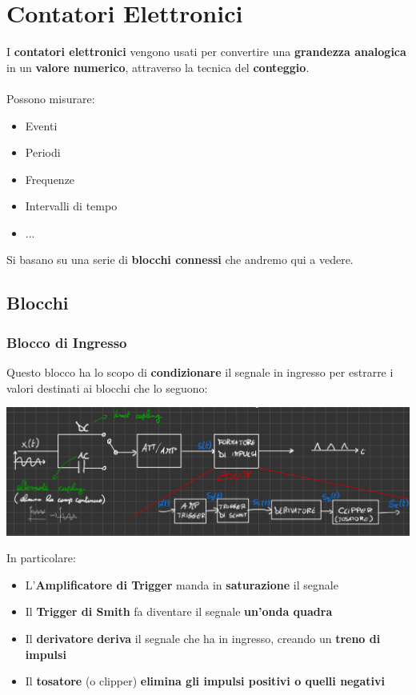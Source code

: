\chapter{Contatori Elettronici}
I \textbf{contatori elettronici} vengono usati per convertire una \textbf{grandezza analogica} in un \textbf{valore numerico}, attraverso la tecnica del \textbf{conteggio}.\\ \\
Possono misurare:
\begin{itemize}
    \item Eventi
    \item Periodi
    \item Frequenze
    \item Intervalli di tempo
    \item ...
\end{itemize}
Si basano su una serie di \textbf{blocchi connessi} che andremo qui a vedere.
\section{Blocchi}
\subsection{Blocco di Ingresso}
Questo blocco ha lo scopo di \textbf{condizionare} il segnale in ingresso per estrarre i valori destinati ai blocchi che lo seguono:
\begin{center}
    \includegraphics[width=\textwidth]{Images/figure7.png}
\end{center}
In particolare:
\begin{itemize}
    \item L'\textbf{Amplificatore di Trigger} manda in \textbf{saturazione} il segnale
    \item Il \textbf{Trigger di Smith} fa diventare il segnale \textbf{un'onda quadra}
    \item Il \textbf{derivatore} \textbf{deriva} il segnale che ha in ingresso, creando un \textbf{treno di impulsi}
    \item Il \textbf{tosatore} (o clipper) \textbf{elimina gli impulsi positivi o quelli negativi}
\end{itemize}
